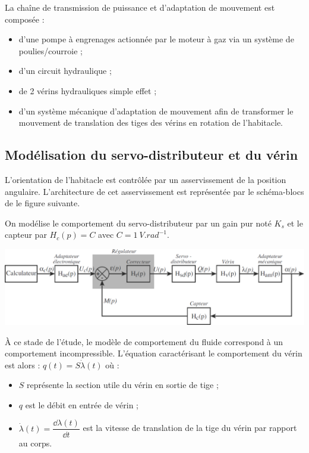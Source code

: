 \documentclass[10pt,fleqn]{article} %
\begin{document}
\begin{multicols}{2}
La chaîne de transmission de puissance et d'adaptation de mouvement est composée :
\begin{itemize}
\item d'une pompe à engrenages actionnée par le moteur à gaz via un système de poulies/courroie ;
\item d'un circuit hydraulique ;
\item de 2 vérins hydrauliques simple effet ;
\item d'un système mécanique d'adaptation de mouvement afin de transformer le mouvement de translation des tiges des vérins en rotation de l'habitacle.
\end{itemize}

\subsection*{Modélisation du servo-distributeur et du vérin}

L'orientation de l'habitacle est contrôlée par un asservissement de la position angulaire. L'architecture de cet asservissement est représentée par le schéma-blocs de le figure suivante.

On modélise le comportement du servo-distributeur par un gain pur noté $K_s$ et le capteur par $H_c(p)=C$ avec $C=\SI{1}{V.rad^{-1}}$.

\begin{center}
\includegraphics[width=\linewidth]{images/fig_05}
\end{center}

À ce stade de l'étude, le modèle de comportement du fluide correspond à un comportement incompressible. L'équation caractérisant le comportement du vérin est alors : $q(t)=S\dot{\lambda}(t)$ où :
\begin{itemize}
\item $S$ représente la section utile du vérin en sortie de tige ;
\item $q$ est le débit en entrée de vérin ;
\item $\dot{\lambda}(t)=\dfrac{\dd \lambda(t) }{\dd t}$ est la vitesse de translation de la tige du vérin par rapport au corps.
\end{itemize}
% 


\end{multicols}
\end{document}
